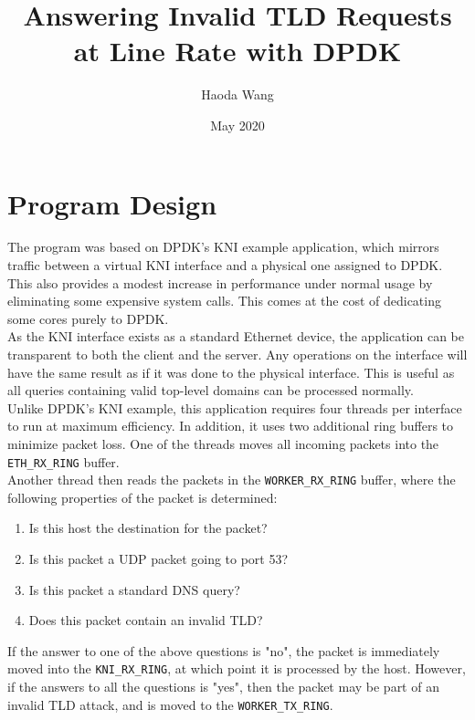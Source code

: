 \documentclass[12pt]{extarticle}
\title{Answering Invalid TLD Requests at Line Rate with DPDK}
\author{Haoda Wang}
\date{May 2020}
\begin{document}
\maketitle

\section{Program Design}
The program was based on DPDK's KNI example application, which mirrors traffic between a virtual KNI interface and a physical one assigned to DPDK. This also provides a modest increase in performance under normal usage by eliminating some expensive system calls. This comes at the cost of dedicating some cores purely to DPDK. \\

As the KNI interface exists as a standard Ethernet device, the application can be transparent to both the client and the server. Any operations on the interface will have the same result as if it was done to the physical interface. This is useful as all queries containing valid top-level domains can be processed normally. \\

Unlike DPDK's KNI example, this application requires four threads per interface to run at maximum efficiency. In addition, it uses two additional ring buffers to minimize packet loss. One of the threads moves all incoming packets into the \texttt{ETH\_RX\_RING} buffer. \\

Another thread then reads the packets in the \texttt{WORKER\_RX\_RING} buffer, where the following properties of the packet is determined:

\begin{enumerate}
  \item Is this host the destination for the packet?
  \item Is this packet a UDP packet going to port 53?
  \item Is this packet a standard DNS query?
  \item Does this packet contain an invalid TLD?
\end{enumerate}

If the answer to one of the above questions is "no", the packet is immediately moved into the \texttt{KNI\_RX\_RING}, at which point it is processed by the host. However, if the answers to all the questions is "yes", then the packet may be part of an invalid TLD attack, and is moved to the \texttt{WORKER\_TX\_RING}. \\
\end{document}
